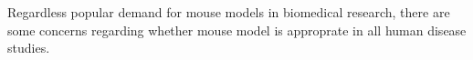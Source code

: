 Regardless popular demand for mouse models in biomedical research, there are some concerns regarding whether mouse model is approprate in all human disease studies. 